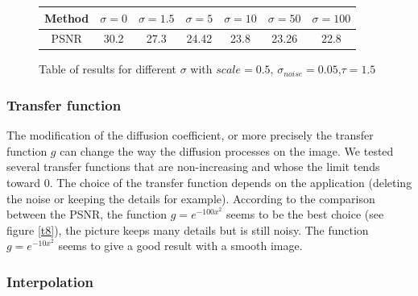 \documentclass{report}
\begin{document}
 \begin{figure}[h!]
        \centering
        \label{T7}
         \caption{Table of results for different $\sigma$ with $scale=0.5$, $\sigma_{noise}=0.05$,$\tau=1.5$}
        \begin{tabular}{|c|c|c|c|c|c|c|}
        \hline
        Method & $\sigma=0$ & $\sigma=1.5$ & $\sigma=5$ & $\sigma=10$ & $\sigma=50$ & $\sigma=100$ \\
        \hline
        PSNR  & 30.2 & 27.3 & 24.42 & 23.8 & 23.26 & 22.8 \\
        \hline
        \end{tabular}
        \end{figure}







\subsubsection{Transfer function}


The modification of the diffusion coefficient, or more precisely the transfer function $g$ can change the way the diffusion processes on the image. We tested several transfer functions that are non-increasing and whose the limit tends toward 0. The choice of the transfer function depends on the application (deleting the noise or keeping the details for example). According to the comparison between the PSNR, the function $g= e^{-{100 x}^2}$ seems to be the best choice (see figure \ref{t8}), the picture keeps many details but is still noisy. The function $g= e^{-{10 x}^2}$ seems to give a good result with a smooth image.  \\












\subsubsection{Interpolation}
\end{document}

